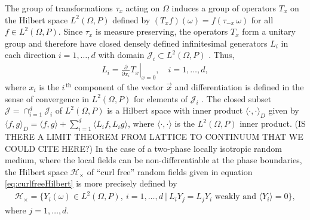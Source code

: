 \documentclass{cmslatex}
\begin{document}
The group of transformations $\tau_x$ acting on $\Omega$ induces a group of
operators $T_x$ on the Hilbert space $L^2(\Omega,P)$ defined by
$(T_xf)(\omega)=f(\tau_{-x}\,\omega)$ for all $f\in L^2(\Omega,P)$. Since $\tau_x$ is measure
preserving, the operators $T_x$ form a unitary group and therefore
have closed densely defined infinitesimal generators $L_i$ in each
direction $i=1,\ldots,d$ with domain $\mathscr{J}_i\subset L^2(\Omega,P)$
\cite{Golden:CMP-467}. Thus,  
%
\begin{align*}
  L_i=\left.\frac{\partial}{\partial x_i}T_x \right|_{x=0}, \quad i=1,\ldots,d,
\end{align*}
%
where $x_i$
is the $i^{\,\text{th}}$ component of the vector
$\vec{x}$ and differentiation is defined in the sense of convergence in $L^2(\Omega,P)$
for elements of $\mathscr{J}_i$ \cite{Golden:CMP-467}. The closed subset
$\mathscr{J}=\cap_{i=1}^d\mathscr{J}_i$ of $L^2(\Omega,P)$ is a Hilbert space
\cite{Golden:CMP-467} with inner product $\langle \cdot,\cdot\rangle_D$ given by 
$\langle f,g\rangle_D=\langle f,g\rangle+\sum_{i=1}^d\langle L_if,L_ig\rangle$, where $\langle\cdot,\cdot\rangle$ is the $L^2(\Omega,P)$
inner product.
(IS THERE A LIMIT THEOREM FROM LATTICE TO CONTINUUM THAT WE COULD CITE
HERE?)
In the case of a two-phase locally isotropic random medium, where the
local fields can be non-differentiable at the phase boundaries, the
Hilbert space $\mathscr{H}_\times$ of ``curl free'' random fields given in
equation \eqref{eq:curlfreeHilbert} is more precisely defined by
\cite{Golden:CMP-467}  
%
\begin{align}\label{eq:curlfreeHilbert_Precise}
  \mathscr{H}_\times=
  \{Y_i(\omega)\in L^2(\Omega,P), \ i=1,\ldots,d \ | \ L_iY_j=L_jY_i \text{ weakly and }
    \langle Y_i\rangle=0\},
\end{align}
%
where $j=1,\ldots,d$.
\end{document}
